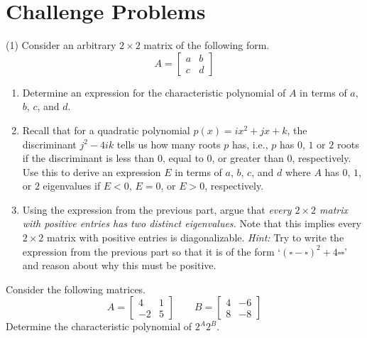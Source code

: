 \section{Challenge Problems}

\begin{tasks}[resume, style=enumerate](1)
\task
  Consider an arbitrary $2 \times 2$ matrix of the following form.
  \begin{displaymath}
    A =
    \begin{bmatrix}
      a & b \\
      c & d
    \end{bmatrix}
  \end{displaymath}

  \begin{enumerate}[label=(\alph*)]
  \item
    Determine an expression for the characteristic polynomial of $A$
    in terms of $a$, $b$, $c$, and $d$.
  \item
    Recall that for a quadratic polynomial $p(x) = ix^2 + jx + k$, the
    discriminant $j^2 - 4ik$ tells us how many roots $p$ has, i.e.,
    $p$ has $0$, $1$ or $2$ roots if the discriminant is less than
    $0$, equal to $0$, or greater than $0$, respectively.  Use this to
    derive an expression $E$ in terms of $a$, $b$, $c$, and $d$ where
    $A$ has $0$, $1$, or $2$ eigenvalues if $E < 0$, $E = 0$, or $E >
    0$, respectively.
  \item Using the expression from the previous part, argue that
    \textit{every $2 \times 2$ matrix with positive entries has two
      distinct eigenvalues.}  Note that this implies every $2 \times
    2$ matrix with positive entries is diagonalizable.  \textit{Hint:}
    Try to write the expression from the previous part so that it is
    of the form `$(\square - \square)^2 + 4\square\square$' and reason
    about why this must be positive.
  \end{enumerate}
\task
  Consider the following matrices.
  \begin{displaymath}
    A =
    \begin{bmatrix}
      4 & 1 \\
     -2 & 5
    \end{bmatrix}
    \qquad
    B =
    \begin{bmatrix}
      4 & -6 \\
      8 & -8
    \end{bmatrix}
  \end{displaymath}
  Determine the characteristic polynomial of $2^A 2^B$.
\end{tasks}
